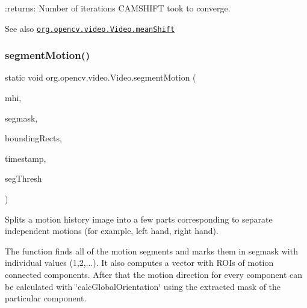 \+:returns\+: Number of iterations C\+A\+M\+S\+H\+I\+FT took to converge.

\begin{DoxySeeAlso}{See also}
\href{http://docs.opencv.org/modules/video/doc/motion_analysis_and_object_tracking.html#meanshift}{\tt org.\+opencv.\+video.\+Video.\+mean\+Shift} 
\end{DoxySeeAlso}
\mbox{\label{classorg_1_1opencv_1_1video_1_1_video_a60660bfd1343bdaf7e2336ae884ddbb1}} 
\subsubsection{\texorpdfstring{segment\+Motion()}{segmentMotion()}}
{\footnotesize\ttfamily static void org.\+opencv.\+video.\+Video.\+segment\+Motion (\begin{DoxyParamCaption}\item[{\mbox{\hyperlink{classorg_1_1opencv_1_1core_1_1_mat}{Mat}}}]{mhi,  }\item[{\mbox{\hyperlink{classorg_1_1opencv_1_1core_1_1_mat}{Mat}}}]{segmask,  }\item[{\mbox{\hyperlink{classorg_1_1opencv_1_1core_1_1_mat_of_rect}{Mat\+Of\+Rect}}}]{bounding\+Rects,  }\item[{double}]{timestamp,  }\item[{double}]{seg\+Thresh }\end{DoxyParamCaption})\hspace{0.3cm}{\ttfamily [static]}}

Splits a motion history image into a few parts corresponding to separate independent motions (for example, left hand, right hand).

The function finds all of the motion segments and marks them in {\ttfamily segmask} with individual values (1,2,...). It also computes a vector with R\+O\+Is of motion connected components. After that the motion direction for every component can be calculated with \char`\"{}calc\+Global\+Orientation\char`\"{} using the extracted mask of the particular component.



